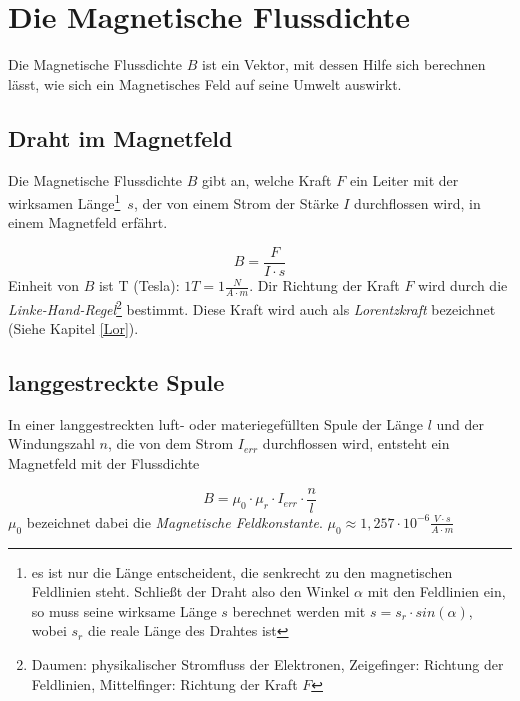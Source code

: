 
		\chapter{Die Magnetische Flussdichte}

Die Magnetische Flussdichte \(B\) ist ein Vektor, mit dessen Hilfe sich berechnen lässt, wie sich ein Magnetisches Feld auf seine Umwelt auswirkt.

		\section{Draht im Magnetfeld} \label{sec1}

Die Magnetische Flussdichte \(B\) gibt an, welche Kraft \(F\) ein Leiter mit der wirksamen Länge\footnote{es ist nur die Länge entscheident, die senkrecht zu den magnetischen Feldlinien steht. Schließt der Draht also den Winkel \(\alpha\) mit den Feldlinien ein, so muss seine wirksame Länge \(s\) berechnet werden mit \(s = s_r \cdot sin(\alpha)\), wobei \(s_r\) die reale Länge des Drahtes ist}~\(s\), der von einem Strom der Stärke \(I\) durchflossen wird, in einem Magnetfeld erfährt.

\begin{equation}
B = \frac{F}{I \cdot s}
\label{Def_B}
\end{equation}
Einheit von \(B\) ist T (Tesla): \(1 T = 1 \frac{N}{A \cdot m}\). Dir Richtung der Kraft \(F\) wird durch die \textit{Linke-Hand-Regel}\footnote{Daumen: physikalischer Stromfluss der Elektronen, Zeigefinger: Richtung der Feldlinien, Mittelfinger: Richtung der Kraft \(F\)} bestimmt.	Diese Kraft wird auch als \textit{Lorentzkraft} bezeichnet (Siehe Kapitel \ref{Lor}).

		\section{langgestreckte Spule}

In einer langgestreckten luft- oder materiegefüllten Spule der Länge \(l\) und der Windungszahl \(n\), die von dem Strom \(I_{err}\) durchflossen wird, entsteht ein Magnetfeld mit der Flussdichte

\begin{equation}
B = \mu_0 \cdot \mu_r \cdot I_{err} \cdot \frac{n}{l}
\label{eq_langspule}
\end{equation}
\(\mu_0\) bezeichnet dabei die \textit{Magnetische Feldkonstante}. \(\mu_0 \approx 1,257 \cdot 10^{-6} \frac{V \cdot s}{A \cdot m}\)

